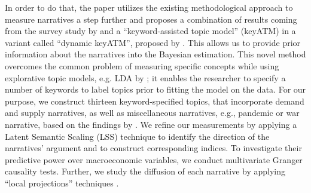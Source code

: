 In order to do that, the paper utilizes the existing methodological approach to measure narratives a step further and proposes a combination of results coming from the survey study by \cite{Andre.2023} and a ``keyword-assisted topic model'' (\textsf{keyATM}) in a variant called ``dynamic \textsf{keyATM}'', proposed by \cite{Eshima.2023}. This allows us to provide prior information about the narratives into the Bayesian estimation. This novel method overcomes the common problem of measuring specific concepts while using explorative topic models, e.g. LDA by \cite{blei.2003}; it enables the researcher to specify a number of keywords to label topics prior to fitting the model on the data. For our purpose, we construct thirteen keyword-specified topics, that incorporate demand and supply narratives, as well as miscellaneous narratives, e.g., pandemic or war narrative, based on the findings by \cite{Andre.2023}. We refine our measurements by applying a Latent Semantic Scaling (\textsf{LSS}) technique \citep{Watanabe.2021} to identify the direction of the narratives' argument and to construct corresponding indices. To investigate their predictive power over macroeconomic variables, we conduct multivariate Granger causality tests. Further, we study the diffusion of each narrative by applying ``local projections'' techniques \citep{Jorda.2005}.

